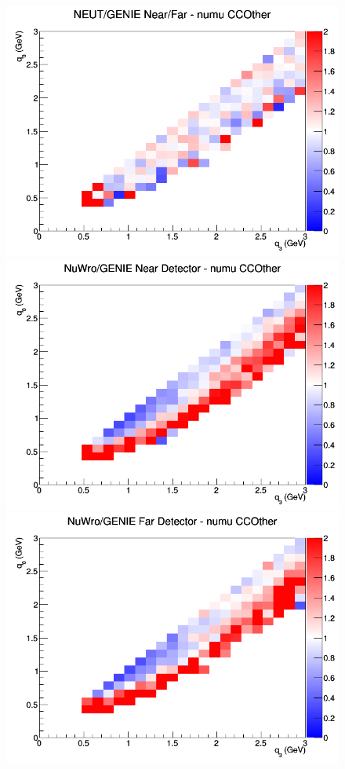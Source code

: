 \documentclass[12pt]{article}
\begin{document}
\begin{figure}[h]
\endminipage
{}
\includegraphics[width=\linewidth]{q0_q3/nominal/ratios/CCOther_NEUT_GENIE_numu_NF_q3_q0.png}
\endminipage
\newline
{}
\includegraphics[width=\linewidth]{q0_q3/nominal/ratios/CCOther_NuWro_GENIE_numu_near_q3_q0.png}
\endminipage
{}
\includegraphics[width=\linewidth]{q0_q3/nominal/ratios/CCOther_NuWro_GENIE_numu_far_q3_q0.png}

\end{figure}
\end{document}
